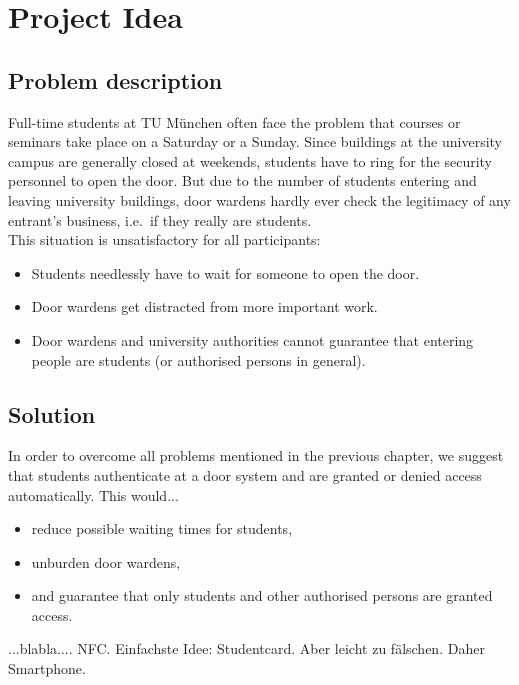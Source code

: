 \section{Project Idea}



\subsection{Problem description}

Full-time students at TU München often face the problem that courses or seminars take place on a Saturday or a Sunday.
Since buildings at the university campus are generally closed at weekends, students have to ring for the security personnel to open the door. But due to the number of students entering and leaving university buildings, door wardens hardly ever check the legitimacy of any entrant's business, i.e.~if they really are students.\\
This situation is unsatisfactory for all participants:

\begin{itemize}
\item Students needlessly have to wait for someone to open the door.
\item Door wardens get distracted from more important work.
\item Door wardens and university authorities cannot guarantee that entering people are students (or authorised persons in general).
\end{itemize}

\subsection{Solution}

In order to overcome all problems mentioned in the previous chapter, we suggest that students authenticate at a door system and are granted or denied access automatically. This would...

\begin{itemize}
\item reduce possible waiting times for students,
\item unburden door wardens,
\item and guarantee that only students and other authorised persons are granted access.
\end{itemize}

...blabla.... NFC.
Einfachste Idee: Studentcard. Aber leicht zu fälschen. Daher Smartphone.